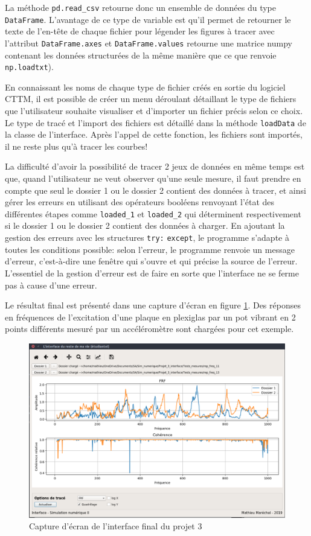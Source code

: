 \documentclass[a4paper, 11pt]{article}
\begin{document}
La méthode \verb|pd.read_csv| retourne donc un ensemble de données du type \verb|DataFrame|. L'avantage de ce type de variable est qu'il permet de retourner le texte de l'en-tête de chaque fichier pour légender les figures à tracer avec l'attribut \verb|DataFrame.axes| et \verb|DataFrame.values| retourne une matrice numpy contenant les données structurées de la même manière que ce que renvoie \verb|np.loadtxt|).

En connaissant les noms de chaque type de fichier créés en sortie du logiciel CTTM, il est possible de créer un menu déroulant détaillant le type de fichiers que l'utilisateur souhaite visualiser et d'importer un fichier précis selon ce choix. Le type de tracé et l'import des fichiers est détaillé dans la méthode 	\verb|loadData| de la classe de l'interface. Après l'appel de cette fonction, les fichiers sont importés, il ne reste plus qu'à tracer les courbes!

La difficulté d'avoir la possibilité de tracer 2 jeux de données en même temps est que, quand l'utilisateur ne veut observer qu'une seule mesure, il faut prendre en compte que seul le dossier 1 ou le dossier 2 contient des données à tracer, et ainsi gérer les erreurs en utilisant des opérateurs booléens renvoyant l'état des différentes étapes comme \verb|loaded_1| et \verb|loaded_2| qui déterminent respectivement si le dossier 1 ou le dossier 2 contient des données à charger. En ajoutant la gestion des erreurs avec les structures \verb|try:| \verb|except|, le programme s'adapte à toutes les conditions possible: selon l'erreur, le programme renvoie un message d'erreur, c'est-à-dire une fenêtre qui s'ouvre et qui précise la source de l'erreur. L'essentiel de la gestion d'erreur est de faire en sorte que l'interface ne se ferme pas à cause d'une erreur. 

Le résultat final est présenté dans une capture d'écran en figure \ref{fig:interf_final}. Des réponses en fréquences de l'excitation d'une plaque en plexiglas par un pot vibrant en 2 points différents mesuré par un accéléromètre sont chargées pour cet exemple.

\begin{figure}[H]
	\centering
	\includegraphics[scale=0.3]{Figures/interf_final.png}
	\caption{Capture d'écran de l'interface final du projet 3}
	\label{fig:interf_final}
\end{figure}
\end{document}
